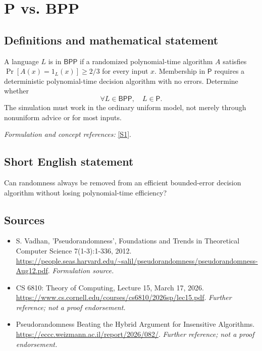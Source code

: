 \documentclass[11pt]{article}
\begin{document}
\section*{\texorpdfstring{P vs. BPP}{P vs. BPP}}\label{statement}
\subsection{Definitions and mathematical statement}
A language $L$ is in $\mathsf{BPP}$ if a randomized polynomial-time algorithm $A$ satisfies $\Pr[A(x)=1_L(x)]\ge2/3$ for every input $x$. Membership in $\mathsf P$ requires a deterministic polynomial-time decision algorithm with no errors. Determine whether
\[
 \forall L\in\mathsf{BPP},\quad L\in\mathsf P.
\]
The simulation must work in the ordinary uniform model, not merely through nonuniform advice or for most inputs.
\par\smallskip\textit{Formulation and concept references:} \href{https://people.seas.harvard.edu/~salil/pseudorandomness/pseudorandomness-Aug12.pdf}{[S1]}.

\subsection{Short English statement}
Can randomness always be removed from an efficient bounded-error decision algorithm without losing polynomial-time efficiency?
\subsection{Sources}
\begin{itemize}
\item[S1]S. Vadhan, 'Pseudorandomness', Foundations and Trends in Theoretical Computer Science 7(1-3):1-336, 2012.
\url{https://people.seas.harvard.edu/~salil/pseudorandomness/pseudorandomness-Aug12.pdf}.
\textit{Formulation source.}
\item[S2]CS 6810: Theory of Computing, Lecture 15, March 17, 2026.
\url{https://www.cs.cornell.edu/courses/cs6810/2026sp/lec15.pdf}.
\textit{Further reference; not a proof endorsement.}
\item[S3]Pseudorandomness Beating the Hybrid Argument for Insensitive Algorithms.
\url{https://eccc.weizmann.ac.il/report/2026/082/}.
\textit{Further reference; not a proof endorsement.}
\end{itemize}
\end{document}
